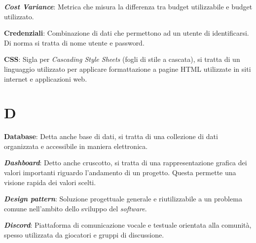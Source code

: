 \documentclass[5pt]{article}
\begin{document}
\begin{flushleft}
\textbf{\textit{Cost Variance}}: Metrica che misura la differenza tra budget utilizzabile e budget utilizzato.\newline

\textbf{Credenziali}: Combinazione di dati che permettono ad un utente di identificarsi. Di norma si tratta di nome utente e password.\newline

\textbf{CSS}: Sigla per \textit{Cascading Style Sheets} (fogli di stile a cascata), si tratta di un linguaggio utilizzato per applicare formattazione a pagine HTML utilizzate in siti internet e applicazioni web.\\

\end{flushleft}

\pagebreak

\section*{D}
\begin{flushleft}

\textbf{Database}: Detta anche base di dati, si tratta di una collezione di dati organizzata e accessibile in maniera elettronica.\newline

\textbf{\textit{Dashboard}}: Detto anche cruscotto, si tratta di una rappresentazione grafica dei valori importanti riguardo l'andamento di un progetto. Questa permette una visione rapida dei valori scelti.\newline

\textbf{\textit{Design pattern}}: Soluzione progettuale generale e riutilizzabile a un problema comune nell'ambito dello sviluppo del \textit{software}.\newline


\textbf{\textit{Discord}}: Piattaforma di comunicazione vocale e testuale orientata alla comunità, spesso utilizzata da giocatori e gruppi di discussione.\newline


\end{flushleft}

\pagebreak
\end{document}
